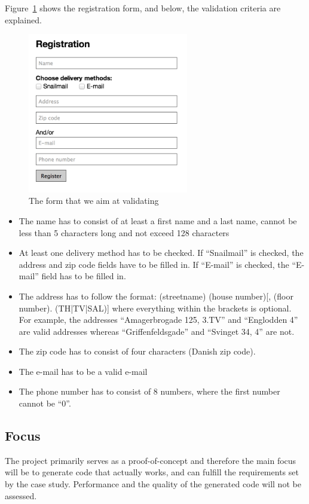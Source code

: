 		Figure~\ref{registrationForm} shows the registration form, and below, the validation criteria are explained.

		\begin{figure}
			\begin{center}
				\centerline{\includegraphics[width=7cm]{resources/images/registrationform.png}}
			\end{center}
			\caption{The form that we aim at validating}
			\label{registrationForm}
		\end{figure}

		\begin{itemize}
			\item The name has to consist of at least a first name and a last name, cannot be less than 5 characters long and not exceed 128 characters
			\item At least one delivery method has to be checked. If “Snailmail” is checked, the address and zip code fields have to be filled in. If “E-mail” is checked, the “E-mail” field has to be filled in.
			\item The address has to follow the format: (streetname) (house number)[, (floor number). (TH|TV|SAL)] where everything within the brackets is optional. For example, the addresses “Amagerbrogade 125, 3.TV” and “Englodden 4” are valid addresses whereas “Griffenfeldsgade” and “Svinget 34, 4” are not.
			\item The zip code has to consist of four characters (Danish zip code).
			\item The e-mail has to be a valid e-mail
			\item The phone number has to consist of 8 numbers, where the first number cannot be “0”.
		\end{itemize}

	\subsection{Focus}
		The project primarily serves as a proof-of-concept and therefore the main focus will be to generate code that actually works, and can fulfill the requirements set by the case study. Performance and the quality of the generated code will not be assessed.

